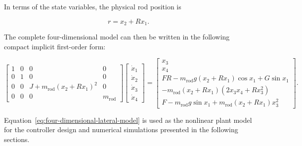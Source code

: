 In terms of the state variables, the physical rod position is

\begin{equation}
r=x_2+Rx_1.
\label{eq:rod-position-state}
\end{equation}

The complete four-dimensional model can then be written in the following compact implicit first-order form:

\begin{equation}
\begin{bmatrix}
1 & 0 & 0 & 0 \\
0 & 1 & 0 & 0 \\
0 & 0 & J+m_{\mathrm{rod}}(x_2+Rx_1)^2 & 0 \\
0 & 0 & 0 & m_{\mathrm{rod}}
\end{bmatrix}
\begin{bmatrix}
\dot{x}_1 \\
\dot{x}_2 \\
\dot{x}_3 \\
\dot{x}_4
\end{bmatrix}
=
\begin{bmatrix}
x_3
\\[4pt]
x_4
\\[4pt]
FR
-m_{\mathrm{rod}}g(x_2+Rx_1)\cos x_1
+G\sin x_1 \\
-m_{\mathrm{rod}}(x_2+Rx_1)
\left(
2x_3x_4+Rx_3^2
\right)
\\[6pt]
F
-m_{\mathrm{rod}}g\sin x_1
+m_{\mathrm{rod}}(x_2+Rx_1)x_3^2
\end{bmatrix}.
\label{eq:four-dimensional-lateral-model}
\end{equation}

Equation~\eqref{eq:four-dimensional-lateral-model} is used as the nonlinear plant model for the controller design and numerical simulations presented in the following sections.